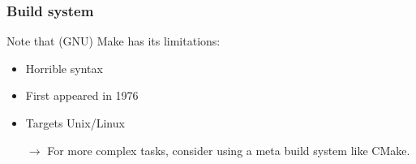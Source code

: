 \documentclass[12pt,t]{beamer}
\newcommand{\conclude}[1]{%
  \begin{itemize}
    \item[$\rightarrow$]#1
  \end{itemize}
}
\begin{document}
  \begin{frame}[fragile]
    \frametitle{Build system}

    Note that (GNU) Make has its limitations:
    \begin{itemize}
      \item Horrible syntax
      \item First appeared in 1976
      \item Targets Unix/Linux
    \end{itemize}

    \conclude{For more complex tasks, consider using a meta build system like CMake.}
  \end{frame}
\end{document}
